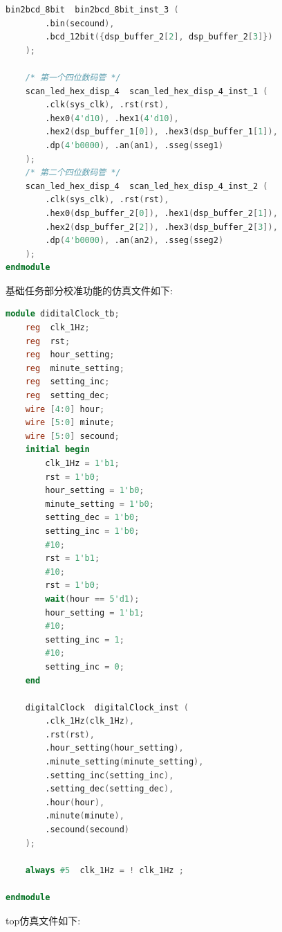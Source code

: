\documentclass{article}
\begin{document}
\begin{lstlisting}[language=Verilog, caption={top源文件}]
    bin2bcd_8bit  bin2bcd_8bit_inst_3 (
        .bin(secound),
        .bcd_12bit({dsp_buffer_2[2], dsp_buffer_2[3]})
    );
    
    /* 第一个四位数码管 */
    scan_led_hex_disp_4  scan_led_hex_disp_4_inst_1 (
        .clk(sys_clk), .rst(rst),
        .hex0(4'd10), .hex1(4'd10),
        .hex2(dsp_buffer_1[0]), .hex3(dsp_buffer_1[1]),
        .dp(4'b0000), .an(an1), .sseg(sseg1)
    );
    /* 第二个四位数码管 */
    scan_led_hex_disp_4  scan_led_hex_disp_4_inst_2 (
        .clk(sys_clk), .rst(rst),
        .hex0(dsp_buffer_2[0]), .hex1(dsp_buffer_2[1]),
        .hex2(dsp_buffer_2[2]), .hex3(dsp_buffer_2[3]),
        .dp(4'b0000), .an(an2), .sseg(sseg2)
    );
endmodule
\end{lstlisting}
基础任务部分校准功能的仿真文件如下:
\begin{lstlisting}[language=Verilog, caption={校准仿真}]
module diditalClock_tb;
    reg  clk_1Hz;
    reg  rst;
    reg  hour_setting;
    reg  minute_setting;
    reg  setting_inc;
    reg  setting_dec;
    wire [4:0] hour;
    wire [5:0] minute;
    wire [5:0] secound;
    initial begin
        clk_1Hz = 1'b1;
        rst = 1'b0;
        hour_setting = 1'b0;
        minute_setting = 1'b0;
        setting_dec = 1'b0;
        setting_inc = 1'b0;
        #10;
        rst = 1'b1;
        #10;
        rst = 1'b0;
        wait(hour == 5'd1);
        hour_setting = 1'b1;
        #10;
        setting_inc = 1;
        #10;
        setting_inc = 0;
    end
    
    digitalClock  digitalClock_inst (
        .clk_1Hz(clk_1Hz),
        .rst(rst),
        .hour_setting(hour_setting),
        .minute_setting(minute_setting),
        .setting_inc(setting_inc),
        .setting_dec(setting_dec),
        .hour(hour),
        .minute(minute),
        .secound(secound)
    );

    always #5  clk_1Hz = ! clk_1Hz ;

endmodule
\end{lstlisting}
top仿真文件如下:
\end{document}
